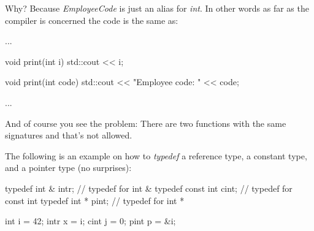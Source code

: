 Why? Because \textit{EmployeeCode} is just an alias for \textit{int}. In
other words as far as the compiler is concerned the code is the same as:

\begin{consolethree}[escapeinside=||]
...

void print(int i)
{
    std::cout << i;
}

void print(int code)
{
    std::cout << "Employee code: " << code;
}

...
\end{consolethree}

And of course you see the problem: There are two functions with the same
signatures and that's not allowed.

The following is an example on how to \textit{typedef} a reference type, a
constant type, and a pointer type (no surprises):

\begin{consolethree}[escapeinside=||]
typedef int & intr;   // typedef for int &
typedef const int cint; // typedef for const int
typedef int * pint;   // typedef for int *

int i = 42;
intr x = i;
cint j = 0;
pint p = &i;
\end{consolethree}



